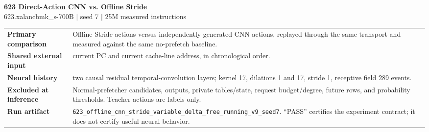 \documentclass[10pt]{article}
\begin{document}
\begin{center}
{\LARGE\bfseries\color{navy} 623 Direct-Action CNN vs. Offline Stride}\\[2pt]
{\small 623.xalancbmk\_s-700B \quad $\vert$ \quad seed 7 \quad $\vert$ \quad 25M measured instructions}\\[4pt]
\quad
{}
\end{center}

\begin{infobox}
\begin{tabularx}{\textwidth}{@{}>{\bfseries}lX@{}}
Primary comparison & Offline Stride actions versus independently generated CNN actions, replayed through the same transport and measured against the same no-prefetch baseline.\\
Shared external input & current PC and current cache-line address, in chronological order.\\
Neural history & two causal residual temporal-convolution layers; kernel 17, dilations 1 and 17, stride 1, receptive field 289 events.\\
Excluded at inference & Normal-prefetcher candidates, outputs, private tables/state, request budget/degree, future rows, and probability thresholds.  Teacher actions are labels only.\\
Run artifact & \texttt{623\_offline\_cnn\_stride\_variable\_delta\_free\_running\_v9\_seed7}.  ``PASS'' certifies the experiment contract; it does not certify useful neural behavior.\\
\end{tabularx}
\end{infobox}
\end{document}
